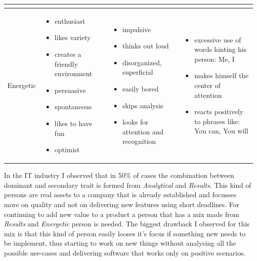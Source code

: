 \begin{table}[h]
\begin{tabular}{p{}p{}p{}p{}}
\begin{itemize}
      \end{itemize}
     \\ \midrule
    Energetic 
     &
      \begin{itemize}
       \item enthusiast
       \item likes variety
       \item creates a friendly environment
       \item persuasive 
       \item spontaneous
       \item likes to have fun
       \item optimist
      \end{itemize}
     &
     \begin{itemize}
      \item impulsive
      \item thinks out loud
      \item disorganized, superficial
      \item easily bored
      \item skips analysis
      \item looks for attention and recognition
     \end{itemize}
     & 
      \begin{itemize}
       \item excessive use of words hinting his person: Me, I 
       \item makes himself the center of attention
       \item reacts positively to phrases like: You can, You will
      \end{itemize}
     \\ \bottomrule
    \end{tabular}
    \label{table:prae}
\end{table}
\FloatBarrier

In the IT industry I observed that in 50\% of cases the combination between dominant and secondary trait is formed from \textit{Analytical} and \textit{Results}. This kind of persons are real assets to a company that is already established and focusses more on quality and not on delivering new features using short deadlines. For continuing to add new value to a product a person that has a mix made from \textit{Results} and \textit{Energetic} person is needed. The biggest drawback I observed for this mix is that this kind of person easily looses it's focus if something new needs to be implement, thus starting to work on new things without analysing all the possible use-cases and delivering software that works only on positive scenarios.
